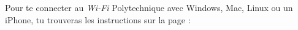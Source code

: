 Pour te connecter au \emph{Wi-Fi} Polytechnique avec Windows, Mac, Linux ou un iPhone, tu trouveras les instructions sur la page : 
\begin{center}
\end{center}


%
%






